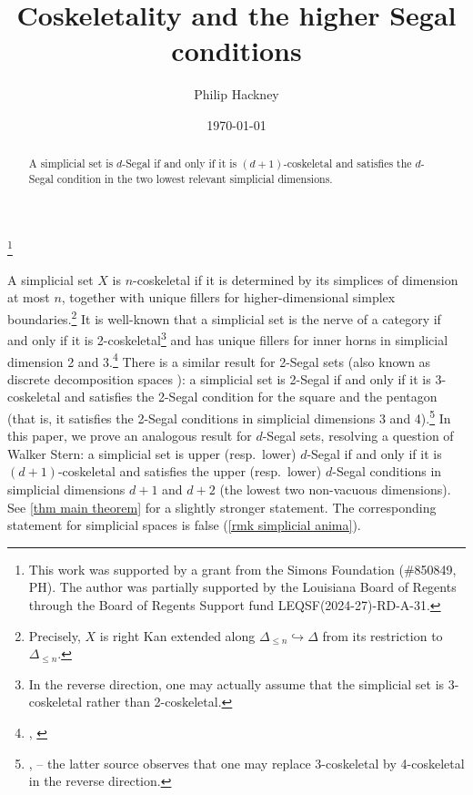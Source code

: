 \documentclass{amsart}
\theoremstyle{definition}
\theoremstyle{remark}
\begin{document}
\title{Coskeletality and the higher Segal conditions}

\author{Philip Hackney}
\address{Department of Mathematics, University of Louisiana at Lafayette}

\thanks{
This work was supported by a grant from the Simons Foundation (\#850849, PH). 
The author was partially supported by the Louisiana Board of Regents through the Board of Regents Support fund LEQSF(2024-27)-RD-A-31.
}

\date{\today}

\begin{abstract}
A simplicial set is $d$-Segal if and only if it is $(d{+}1)$-coskeletal and satisfies the $d$-Segal condition in the two lowest relevant simplicial dimensions.
\end{abstract}

\maketitle

A simplicial set $X$ is $n$-coskeletal if it is determined by its simplices of dimension at most $n$, together with unique fillers for higher-dimensional simplex boundaries.\footnote{Precisely, $X$ is right Kan extended along $\Delta_{\leq n} \hookrightarrow \Delta$ from its restriction to $\Delta_{\leq n}$.} 
It is well-known that a simplicial set is the nerve of a category if and only if it is 2-coskeletal\footnote{In the reverse direction, one may actually assume that the simplicial set is 3-coskeletal rather than 2-coskeletal.} and has unique fillers for inner horns in simplicial dimension 2 and 3.\footnote{\cite{nlab:simplicial_skeleton}, \cite[Lemma 5.2]{Riehl:SSCAQC}}
There is a similar result for 2-Segal sets \cite{DyckerhoffKapranov:HSS} (also known as discrete decomposition spaces \cite{GKT1}):
a simplicial set is 2-Segal if and only if it is 3-coskeletal and satisfies the 2-Segal condition for the square and the pentagon (that is, it satisfies the 2-Segal conditions in simplicial dimensions 3 and 4).\footnote{\cite[Corollary 1.7]{BOORS:2SSetsWC}, \cite[\S4.1]{Stern:P2SC} -- the latter source observes that one may replace 3-coskeletal by 4-coskeletal in the reverse direction.}
In this paper, we prove an analogous result for $d$-Segal sets, resolving a question of Walker Stern: a simplicial set is upper (resp.\ lower) $d$-Segal if and only if it is $(d{+}1)$-coskeletal and satisfies the upper (resp.\ lower) $d$-Segal conditions in simplicial dimensions $d+1$ and $d+2$ (the lowest two non-vacuous dimensions).
See \cref{thm main theorem} for a slightly stronger statement.
The corresponding statement for simplicial spaces is false (\cref{rmk simplicial anima}).
\end{document}
